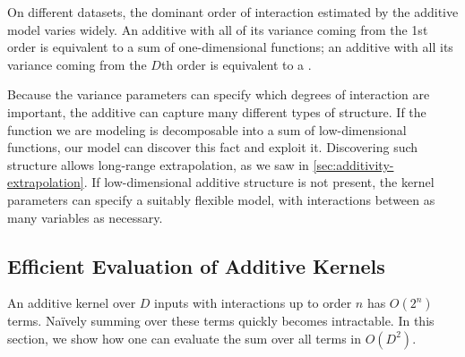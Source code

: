 On different datasets, the dominant order of interaction estimated by the additive model varies widely.
An additive \gp{} with all of its variance coming from the 1st order is equivalent to a sum of one-dimensional functions; an additive \gp{} with all its variance coming from the $D$th order is equivalent to a \SEGP{}.
%
%


Because the variance parameters can specify which degrees of interaction are important, the additive \gp{} can capture many different types of structure.
If the function we are modeling is decomposable into a sum of low-dimensional functions, our model can discover this fact and exploit it.
Discovering such structure allows long-range extrapolation, as we saw in \cref{sec:additivity-extrapolation}.
If low-dimensional additive structure is not present, the kernel parameters can specify a suitably flexible model, with interactions between as many variables as necessary.





\subsection{Efficient Evaluation of Additive Kernels}
An additive kernel over $D$ inputs with interactions up to order $n$ has $O(2^n)$ terms.
Na\"{i}vely summing over these terms quickly becomes intractable.
In this section, we show how one can evaluate the sum over all terms in $O(D^2)$.

